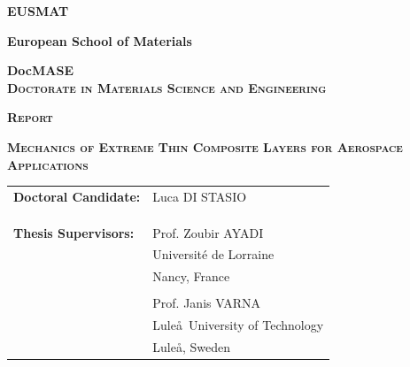 \documentclass[a4paper,twoside,12pt]
{scrartcl} %
\begin{document}
\begin{center}

\vspace*{0.1cm}

\begin{Large}
\textbf{\textsc{EUSMAT}}\\[0.75ex]
\end{Large}

\begin{large}
\textbf{European School of Materials}\\[0.75ex]

\vspace*{1cm}

\textbf{DocMASE}\\[0.75ex]
\textbf{\textsc{Doctorate in Materials Science and Engineering}}
\end{large}

\vspace{2cm}

\begin{Large}
\textbf{\textsc{Report}}\\[0.75ex]
\end{Large}
\vspace*{0.5cm}

\begin{LARGE}
\textbf{\textsc{Mechanics of Extreme Thin Composite Layers for Aerospace Applications}}\\[0.75ex]
\end{LARGE}
\vspace*{2.5cm}

\begin{flushright}
\begin{tabular}{l l }
{\large \textbf{Doctoral Candidate:}} & {\large Luca DI STASIO}\\
&\\
&\\
&\\
{\large \textbf{Thesis Supervisors:}}& {\large Prof. Zoubir AYADI}\\
&{\large Universit\'e de Lorraine}\\
&{\large Nancy, France}\\
&\\
& {\large Prof. Janis VARNA}\\
&{\large Lule\aa\ University of Technology}\\
&{\large Lule\aa, Sweden}\\
\end{tabular}
\end{flushright}


\end{center}
\end{document}
